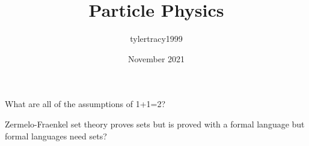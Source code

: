\documentclass{article}
\title{Particle Physics}
\author{tylertracy1999 }
\date{November 2021}
\begin{document}
\maketitle

What are all of the assumptions of 1+1=2?

Zermelo-Fraenkel set theory proves sets but is proved with a formal language but formal languages need sets?
\end{document}
